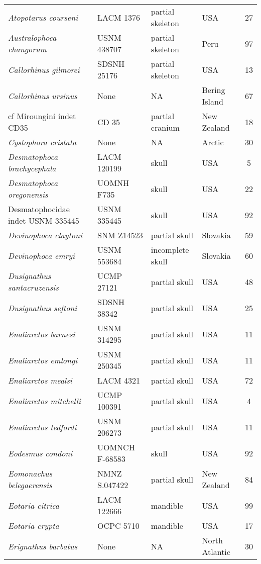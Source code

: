 \begin{longtable}{p{}p{}p{}lc}
\textit{Atopotarus courseni} & 	LACM 1376 & partial skeleton & 	USA & 27\\
\textit{Australophoca changorum} & 	USNM 438707 & partial skeleton & 	Peru & 	97\\
\textit{Callorhinus gilmorei} & 	SDSNH 25176 & partial skeleton & 	USA & 13\\
\textit{Callorhinus ursinus} & 	None & 	NA & 	Bering Island & 67\\
cf Miroungini indet CD35	& CD 35 & 	partial cranium & 	New Zealand & 18\\
\textit{Cystophora cristata} & 	None & 	NA & 	Arctic & 30\\
\textit{Desmatophoca brachycephala} &	LACM 120199 & 	skull & 	USA & 5\\
\textit{Desmatophoca oregonensis} &	UOMNH F735 & 	skull & 	USA & 22\\
Desmatophocidae indet USNM 335445 &	USNM 335445 & 	skull & 	USA & 92\\
\textit{Devinophoca claytoni} &	SNM Z14523 & 	partial skull & 	Slovakia & 59\\
\textit{Devinophoca emryi} &	USNM 553684 & 	incomplete skull & 	Slovakia & 	60\\
\textit{Dusignathus santacruzensis} &	UCMP 27121 & 	partial skull & 	USA & 48\\
\textit{Dusignathus seftoni} &	SDSNH 38342 & 	partial skull & 	USA & 25\\
\textit{Enaliarctos barnesi} &	USNM 314295 & 	partial skull & 	USA & 11\\
\textit{Enaliarctos emlongi} &	USNM 250345 & 	partial skull & 	USA & 11\\
\textit{Enaliarctos mealsi} &	LACM 4321 & 	partial skull & 	USA & 72\\
\textit{Enaliarctos mitchelli} &	UCMP 100391 & 	partial skull & 	USA & 4\\
\textit{Enaliarctos tedfordi} &	USNM 206273 & 	partial skull & 	USA & 11\\
\textit{Eodesmus condoni} &	UOMNCH F-68583 & 	skull & 	USA & 92\\
\textit{Eomonachus belegaerensis} &	NMNZ S.047422 & 	partial skull & 	New Zealand & 84\\
\textit{Eotaria citrica} &	LACM 122666 & 	mandible & 	USA & 99\\
\textit{Eotaria crypta} &	OCPC 5710 & 	mandible & 	USA & 17\\
\textit{Erignathus barbatus} &	None & 	NA & 	North Atlantic & 30\\

\end{longtable}
